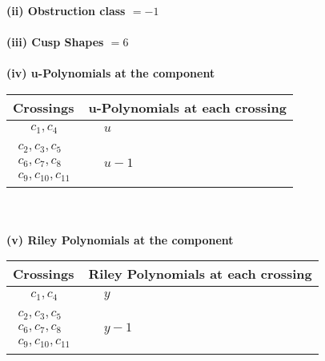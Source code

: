 \documentclass[1p]{elsarticle_modified}
\theoremstyle{definition}
\begin{document}
\flushleft \textbf{(ii) Obstruction class $= -1$}\\~\\
\flushleft \textbf{(iii) Cusp Shapes $= 6$}\\~\\
\newpage\renewcommand{\arraystretch}{1}
\flushleft \textbf{(iv) u-Polynomials at the component}\newline \\
\begin{tabular}{m{50pt}|m{274pt}}
Crossings & \hspace{64pt}u-Polynomials at each crossing \\
\hline $$\begin{aligned}c_{1},c_{4}\end{aligned}$$&$\begin{aligned}
&u
\end{aligned}$\\
\hline $$\begin{aligned}c_{2},c_{3},c_{5}\\c_{6},c_{7},c_{8}\\c_{9},c_{10},c_{11}\end{aligned}$$&$\begin{aligned}
&u-1
\end{aligned}$\\
\hline
\end{tabular}\\~\\
\newpage\renewcommand{\arraystretch}{1}
\flushleft \textbf{(v) Riley Polynomials at the component}\newline \\
\begin{tabular}{m{50pt}|m{274pt}}
Crossings & \hspace{64pt}Riley Polynomials at each crossing \\
\hline $$\begin{aligned}c_{1},c_{4}\end{aligned}$$&$\begin{aligned}
&y
\end{aligned}$\\
\hline $$\begin{aligned}c_{2},c_{3},c_{5}\\c_{6},c_{7},c_{8}\\c_{9},c_{10},c_{11}\end{aligned}$$&$\begin{aligned}
&y-1
\end{aligned}$\\
\hline
\end{tabular}\\~\\
\end{document}
